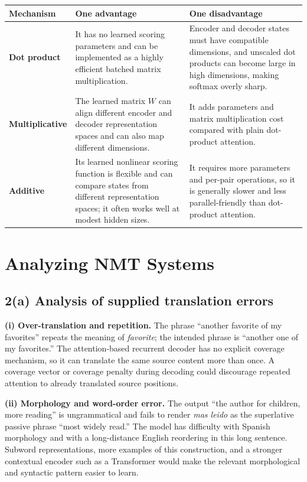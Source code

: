 \documentclass[10pt]{article}
\begin{document}
\begin{tabularx}{\textwidth}{>{\bfseries}p{} X X}
\toprule
Mechanism & One advantage & One disadvantage \\
\midrule
Dot product & It has no learned scoring parameters and can be implemented as a highly efficient batched matrix multiplication. & Encoder and decoder states must have compatible dimensions, and unscaled dot products can become large in high dimensions, making softmax overly sharp. \\
\addlinespace
Multiplicative & The learned matrix $W$ can align different encoder and decoder representation spaces and can also map different dimensions. & It adds parameters and matrix multiplication cost compared with plain dot-product attention. \\
\addlinespace
Additive & Its learned nonlinear scoring function is flexible and can compare states from different representation spaces; it often works well at modest hidden sizes. & It requires more parameters and per-pair operations, so it is generally slower and less parallel-friendly than dot-product attention. \\
\bottomrule
\end{tabularx}

\section{Analyzing NMT Systems}

\subsection*{2(a) Analysis of supplied translation errors}

\textbf{(i) Over-translation and repetition.}
The phrase ``another favorite of my favorites'' repeats the meaning of \emph{favorite}; the intended phrase is ``another one of my favorites.'' The attention-based recurrent decoder has no explicit coverage mechanism, so it can translate the same source content more than once. A coverage vector or coverage penalty during decoding could discourage repeated attention to already translated source positions.

\textbf{(ii) Morphology and word-order error.}
The output ``the author for children, more reading'' is ungrammatical and fails to render \emph{mas leido} as the superlative passive phrase ``most widely read.'' The model has difficulty with Spanish morphology and with a long-distance English reordering in this long sentence. Subword representations, more examples of this construction, and a stronger contextual encoder such as a Transformer would make the relevant morphological and syntactic pattern easier to learn.
\end{document}
